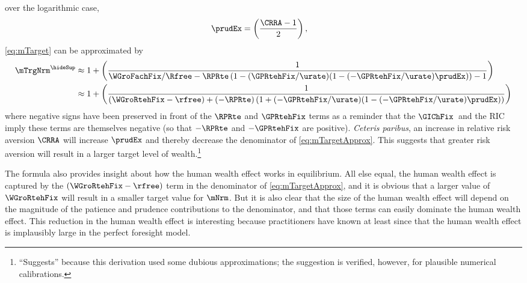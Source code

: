 \documentclass{econark}
\begin{document}
over the logarithmic case,
\begin{equation}\begin{gathered}\begin{aligned}
  \prudEx & =  \left(\frac{\CRRA-1}{2}\right),
\end{aligned}\end{gathered}\end{equation}
\eqref{eq:mTarget} can be approximated by
\begin{equation}\begin{gathered}\begin{aligned}
 \mTrgNrm^{\hideSup} & \approx  1 + \left(\frac{1}{\WGroFachFix/\Rfree-\RPRte \left(1-(\GPRtehFix/\urate)(1-(-\GPRtehFix/\urate)\prudEx) \right)-1}\right)
\\ & \approx  1 + \left(\frac{1}{(\WGroRtehFix-\rfree)+(-\RPRte) \left(1+(-\GPRtehFix/\urate)(1-(-\GPRtehFix/\urate)\prudEx)\right)}\right)
\label{eq:mTargetApprox}
\end{aligned}\end{gathered}\end{equation}
where negative signs have been preserved in front of the $\RPRte$ and $\GPRtehFix$ terms as a reminder that
the $\GIChFix$~and the RIC imply these terms are themselves negative (so that $-\RPRte$ and $-\GPRtehFix$ are positive).
{\it Ceteris paribus}, an increase in relative risk aversion $\CRRA$ will increase $\prudEx$ and thereby decrease the denominator of \eqref{eq:mTargetApprox}.  This suggests that
greater risk aversion will result in a larger target level of wealth.\footnote{``Suggests'' because
this derivation used some dubious approximations; the suggestion is verified, however, for
plausible numerical calibrations.}


The formula also provides insight about how the human wealth effect
works in equilibrium.  All else equal, the human wealth effect is captured
by the $(\WGroRtehFix-\rfree)$ term in the denominator of \eqref{eq:mTargetApprox},
and it is obvious that a larger value of $\WGroRtehFix$ will result in a smaller
target value for $\mNrm$.  But it is also clear that the size of the human wealth
effect will depend on the magnitude of the patience and prudence contributions
to the denominator, and that those terms can easily dominate the human wealth
effect.  This reduction in the human wealth effect is interesting because practitioners have known at least since
\cite{summersCapTax} that the human wealth effect is implausibly large in the
perfect foresight model.
\end{document}
